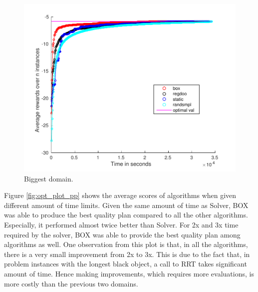 \begin{figure}[htb]
\centering
\includegraphics[scale=0.5]{./figures/place_and_partial_path_vs_t.pdf}
\caption{ Biggest domain.}
\label{fig:biggest_vs_t}
\end{figure} 

\iffalse
Figure \ref{fig:opt_plot_pp} shows the average scores of algorithms when
given different amount of time limits. Given the same amount of
time as Solver, BOX was able to produce the best quality plan compared
to all the other algorithms. Especially, it performed almost
twice better than Solver. For 2x and 3x time required by the solver,
BOX was able to provide the best quality plan among algorithms as well.
One observation from this plot is that, in all the algorithms,
 there is a very small improvement from 2x to 3x. This is due to
the fact that, in problem instances with the longest black object,
a call to RRT takes significant amount of time. Hence making improvements,
which requires more evaluations, is more costly than the previous two
domains. 


